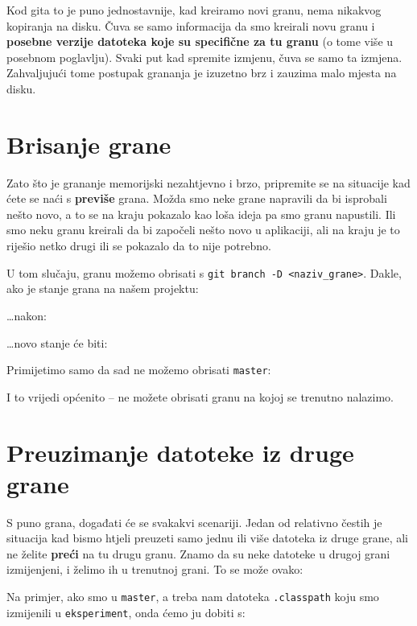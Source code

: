 Kod gita to je puno jednostavnije, kad kreiramo novi granu, nema nikakvog kopiranja na disku. 
Čuva se samo informacija da smo kreirali novu granu i \textbf{posebne verzije datoteka koje su specifične za tu granu} (o tome više u posebnom poglavlju).
Svaki put kad spremite izmjenu, čuva se samo ta izmjena.
Zahvaljujući tome postupak grananja je izuzetno brz i zauzima malo mjesta na disku.

\section*{Brisanje grane}

Zato što je grananje memorijski nezahtjevno i brzo, pripremite se na situacije kad ćete se naći s \textbf{previše} grana.
Možda smo neke grane napravili da bi isprobali nešto novo, a to se na kraju pokazalo kao loša ideja pa smo granu napustili.
Ili smo neku granu kreirali da bi započeli nešto novo u aplikaciji, ali na kraju je to riješio netko drugi ili se pokazalo da to nije potrebno.

U tom slučaju, granu možemo obrisati s \verb+git branch -D <naziv_grane>+. 
Dakle, ako je stanje grana na našem projektu:



\dots{}nakon:



\dots{}novo stanje će biti:



Primijetimo samo da sad ne možemo obrisati \verb+master+:



I to vrijedi općenito -- ne možete obrisati granu na kojoj se trenutno nalazimo.

\section*{Preuzimanje datoteke iz druge grane}

S puno grana, događati će se svakakvi scenariji.
Jedan od relativno čestih je situacija kad bismo htjeli preuzeti samo jednu ili više datoteka iz druge grane, ali ne želite \textbf{preći} na tu drugu granu.
Znamo da su neke datoteke u drugoj grani izmijenjeni, i želimo ih u trenutnoj grani.
To se može ovako:


Na primjer, ako smo u \verb+master+, a treba nam datoteka \verb+.classpath+ koju smo izmijenili u \verb+eksperiment+, onda ćemo ju dobiti s:


